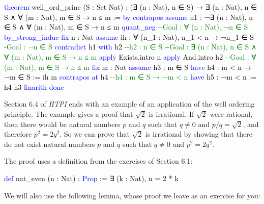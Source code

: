 \documentclass[
  letterpaper,
  DIV=11,
  numbers=noendperiod]{scrreprt}
\newenvironment{Shaded}{\begin{snugshade}}{\end{snugshade}}
\newcommand{\CommentTok}[1]{\textcolor[rgb]{0.37,0.37,0.37}{#1}}
\newcommand{\KeywordTok}[1]{\textcolor[rgb]{0.00,0.23,0.31}{#1}}
\newcommand{\NormalTok}[1]{\textcolor[rgb]{0.00,0.23,0.31}{#1}}
\renewcommand{\NormalTok}[1]{\textcolor[HTML]{000000}{#1}}
\renewcommand{\KeywordTok}[1]{\textcolor[HTML]{0000FF}{#1}}
\renewcommand{\CommentTok}[1]{\textcolor[HTML]{008000}{#1}}
\theoremstyle{remark}
\begin{document}
\begin{Shaded}
\begin{Highlighting}[]
\KeywordTok{theorem}\NormalTok{ well\_ord\_princ (S : Set Nat) : (∃ (n : Nat), n ∈ S) →}
\NormalTok{    ∃ (n : Nat), n ∈ S ∧ ∀ (m : Nat), m ∈ S → n ≤ m := }\KeywordTok{by}
  \KeywordTok{contrapos}
  \KeywordTok{assume}\NormalTok{ h1 : ¬∃ (n : Nat), n ∈ S ∧ ∀ (m : Nat), m ∈ S → n ≤ m}
  \KeywordTok{quant\_neg}                   \CommentTok{{-}{-}Goal : ∀ (n : Nat), ¬n ∈ S}
  \KeywordTok{by\_strong\_induc}
  \KeywordTok{fix}\NormalTok{ n : Nat}
  \KeywordTok{assume}\NormalTok{ ih : ∀ (n\_1 : Nat), n\_1 \textless{} n → ¬n\_1 ∈ S  }\CommentTok{{-}{-}Goal : ¬n ∈ S}
  \KeywordTok{contradict}\NormalTok{ h1 }\KeywordTok{with}\NormalTok{ h2       }\CommentTok{{-}{-}h2 : n ∈ S}
    \CommentTok{{-}{-}Goal : ∃ (n : Nat), n ∈ S ∧ ∀ (m : Nat), m ∈ S → n ≤ m}
  \KeywordTok{apply}\NormalTok{ Exists.intro n}
  \KeywordTok{apply}\NormalTok{ And.intro h2          }\CommentTok{{-}{-}Goal : ∀ (m : Nat), m ∈ S → n ≤ m}
  \KeywordTok{fix}\NormalTok{ m : Nat}
  \KeywordTok{assume}\NormalTok{ h3 : m ∈ S}
  \KeywordTok{have}\NormalTok{ h4 : m \textless{} n → ¬m ∈ S := ih m}
  \KeywordTok{contrapos} \KeywordTok{at}\NormalTok{ h4             }\CommentTok{{-}{-}h4 : m ∈ S → ¬m \textless{} n}
  \KeywordTok{have}\NormalTok{ h5 : ¬m \textless{} n := h4 h3}
  \KeywordTok{linarith}
  \KeywordTok{done}
\end{Highlighting}
\end{Shaded}

Section 6.4 of \emph{HTPI} ends with an example of an application of the
well ordering principle. The example gives a proof that \(\sqrt{2}\) is
irrational. If \(\sqrt{2}\) were rational, then there would be natural
numbers \(p\) and \(q\) such that \(q \ne 0\) and \(p/q = \sqrt{2}\),
and therefore \(p^2 = 2q^2\). So we can prove that \(\sqrt{2}\) is
irrational by showing that there do not exist natural numbers \(p\) and
\(q\) such that \(q \ne 0\) and \(p^2 = 2q^2\).

The proof uses a definition from the exercises of Section 6.1:

\begin{Shaded}
\begin{Highlighting}[]
\KeywordTok{def}\NormalTok{ nat\_even (n : Nat) : }\KeywordTok{Prop}\NormalTok{ := ∃ (k : Nat), n = 2 * k}
\end{Highlighting}
\end{Shaded}

We will also use the following lemma, whose proof we leave as an
exercise for you:
\end{document}

